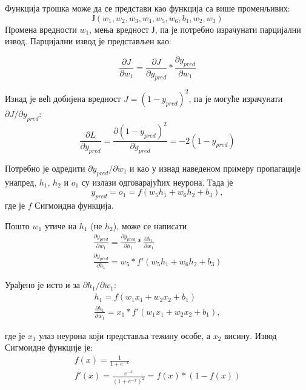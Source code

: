 \documentclass[12pt, а4paper]{article}
\begin{document}
Функција трошка може да се представи као функција 
са више променљивих:
\begin{equation}
Ј(w_1,w_2,w_3,w_4,w_5,w_6,b_1,w_2,w_3)
\end{equation}
Промена вредности $w_1$, мења вредност $Ј$, па је потребно израчунати
парцијални извод. Парцијални извод је представљен као:

\begin{equation}
\frac{\partial J}{\partial w_1} = \frac{\partial J}{\partial y_{pred}} * \frac{\partial y_{pred}}{\partial w_1}
\end{equation}

Изнад је већ добијена вредност $J = (1 - y_{pred})^2$, па је могуће израчунати
$\partial J / \partial y_{pred}$:
\begin{equation}
\frac{\partial L}{\partial y_{pred}} = \frac{\partial (1 - y_{pred})^2}{\partial y_{pred}} = -2(1 - y_{pred})
\end{equation}

Потребно је одредити $\partial y_{pred} / \partial w_1$ и као у изнад
наведеном примеру пропагације унапред, $h_1$, $h_2$ и $o_1$ су излази
одговарајућих неурона. Тада је
\begin{equation}
y_{pred} = o_1 = f(w_5 h_1 + w_6 h_2 + b_3),
\end{equation}
где је $f$ Сигмоидна функција.

Пошто $w_1$ утиче на $h_1$ (не $h_2$), може се написати
\begin{equation}
\begin{gathered}
\frac{\partial y_{pred}}{\partial w_1} = \frac{\partial y_{pred}}{\partial h_1} * \frac{\partial h_1}{\partial w_1} \\
\frac{\partial y_{pred}}{\partial h_1} = w_5 * f'(w_5 h_1 + w_6 h_2 + b_3)
\end{gathered}
\end{equation}

Урађено је исто и за $\partial h_1 / \partial w_1$:
\begin{equation}
\begin{gathered}
h_1 = f(w_1 x_1 + w_2 x_2 + b_1) \\
\frac{\partial h_1}{\partial w_1} = x_1 * f'(w_1 x_1 + w_2 x_2 + b_1),
\end{gathered}
\end{equation}

где је $x_1$ улаз неурона који представља тежину особе, а $x_2$ висину.
Извод Сигмоидне функције је:
\begin{equation}
\begin{gathered}
f(x) = \frac{1}{1 + e^{-x}} \\
f'(x) = \frac{e^{-x}}{(1 + e^{-x})^2} = f(x) * (1 - f(x))
\end{gathered}
\label{eq:izvod}
\end{equation}
\end{document}

